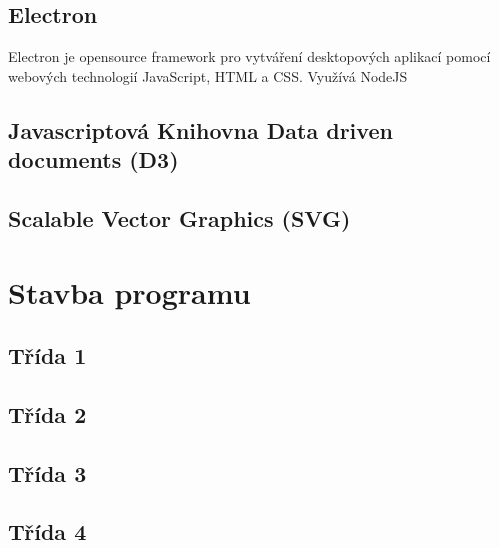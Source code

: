 \documentclass[
  biblatex,
  glossaries,
  index
]{kidiplom}
\begin{document}
\subsection{Electron}
Electron je opensource framework pro vytváření desktopových aplikací pomocí webových technologií JavaScript, HTML a CSS.
Využívá NodeJS


\subsection{Javascriptová Knihovna Data driven documents (D3)}

\subsection{Scalable Vector Graphics (SVG)}




\section{Stavba programu}

\subsection{Třída 1}
\subsection{Třída 2}
\subsection{Třída 3}
\subsection{Třída 4}
\end{document}
